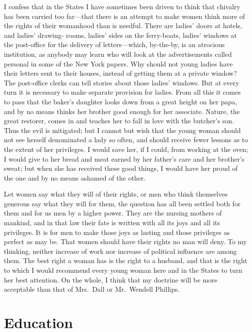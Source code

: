 I confess that in the States I have sometimes been driven to think
that chivalry has been carried too far---that there is an attempt to
make women think more of the rights of their womanhood than is
needful.  There are ladies' doors at hotels, and ladies' drawing-
rooms, ladies' sides on the ferry-boats, ladies' windows at the
post-office for the delivery of letters---which, by-the-by, is an
atrocious institution, as anybody may learn who will look at the
advertisements called personal in some of the New York papers.  Why
should not young ladies have their letters sent to their houses,
instead of getting them at a private window?  The post-office
clerks can tell stories about those ladies' windows.  But at every
turn it is necessary to make separate provision for ladies.  From
all this it comes to pass that the baker's daughter looks down from
a great height on her papa, and by no means thinks her brother good
enough for her associate.  Nature, the great restorer, comes in and
teaches her to fall in love with the butcher's son.  Thus the evil
is mitigated; but I cannot but wish that the young woman should not
see herself denominated a lady so often, and should receive fewer
lessons as to the extent of her privileges.  I would save her, if I
could, from working at the oven; I would give to her bread and meat
earned by her father's care and her brother's sweat; but when she
has received these good things, I would have her proud of the one
and by no means ashamed of the other.

Let women say what they will of their rights, or men who think
themselves generous say what they will for them, the question has
all been settled both for them and for us men by a higher power.
They are the nursing mothers of mankind, and in that law their fate
is written with all its joys and all its privileges.  It is for men
to make those joys as lasting and those privileges as perfect as
may be.  That women should have their rights no man will deny.  To
my thinking, neither increase of work nor increase of political
influence are among them.  The best right a woman has is the right
to a husband, and that is the right to which I would recommend
every young woman here and in the States to turn her best
attention.  On the whole, I think that my doctrine will be more
acceptable than that of Mrs.\ Dall or Mr.\ Wendell Phillips.



\chapter{Education}


